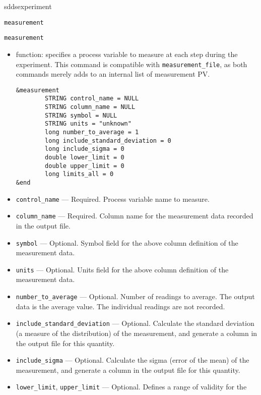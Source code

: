 \begin{sddsprog}{sddsexperiment}
\begin{itemize}
\begin{latexonly}
\newpage\begin{center}{\Large \verb+measurement+}\end{center}
\end{latexonly}
\begin{htmlonly}
  \item {\Large \verb+measurement+}
\end{htmlonly}
  \begin{itemize}
    \item function: specifies a process variable to measure at each step during the experiment.
                This command is compatible with {\verb+measurement_file+}, as both commands
                merely adds to an internal list of measurement PV.
\begin{verbatim}
&measurement
        STRING control_name = NULL
        STRING column_name = NULL
        STRING symbol = NULL
        STRING units = "unknown"
        long number_to_average = 1
        long include_standard_deviation = 0
        long include_sigma = 0
        double lower_limit = 0
        double upper_limit = 0
        long limits_all = 0
&end
\end{verbatim}
    \item {\verb+control_name+} --- Required. Process variable name to measure.
    \item {\verb+column_name+} --- Required. Column name for the measurement data recorded in the output file.
    \item {\verb+symbol+} --- Optional. Symbol field for the above column definition of the measurement data.
    \item {\verb+units+} --- Optional. Units field for the above column definition of the measurement data.
    \item {\verb+number_to_average+} --- Optional. Number of readings to average. The output data
                is the average value. The individual readings are not recorded.
    \item {\verb+include_standard_deviation+} ---  Optional. Calculate the standard deviation
                (a measure of the distribution) of the
                measurement, and generate a column in the output file for this quantity.
    \item {\verb+include_sigma+} ---  Optional. Calculate the sigma (error of the mean) of the
                measurement, and generate a column in the output file for this quantity.
    \item {\verb+lower_limit+}, {\verb+upper_limit+} --- Optional. Defines a range of validity for the

\end{itemize}
\end{itemize}
\end{sddsprog}
